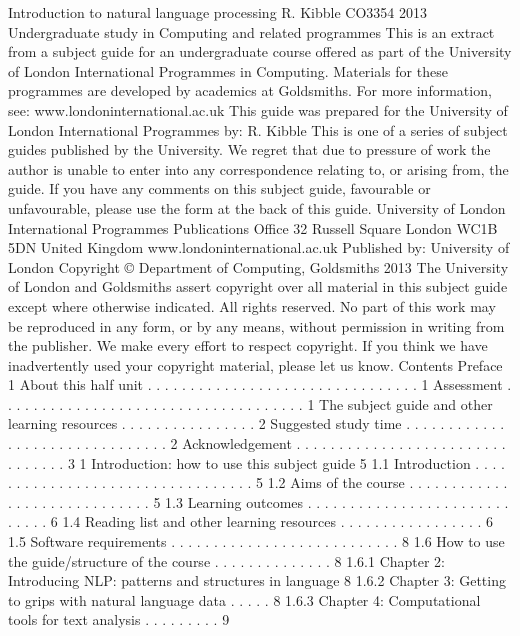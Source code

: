 Introduction to natural
language processing
R. Kibble
CO3354
2013
Undergraduate study in
Computing and related programmes
This is an extract from a subject guide for an undergraduate course offered as part of the
University of London International Programmes in Computing. Materials for these programmes
are developed by academics at Goldsmiths.
For more information, see: www.londoninternational.ac.uk
This guide was prepared for the University of London International Programmes by:
R. Kibble
This is one of a series of subject guides published by the University. We regret that due to pressure of work the author is
unable to enter into any correspondence relating to, or arising from, the guide. If you have any comments on this subject
guide, favourable or unfavourable, please use the form at the back of this guide.
University of London International Programmes
Publications Office
32 Russell Square
London WC1B 5DN
United Kingdom
www.londoninternational.ac.uk
Published by: University of London
Copyright © Department of Computing, Goldsmiths 2013
The University of London and Goldsmiths assert copyright over all material in this subject guide except where otherwise
indicated. All rights reserved. No part of this work may be reproduced in any form, or by any means, without permission in
writing from the publisher. We make every effort to respect copyright. If you think we have inadvertently used your copyright
material, please let us know.
Contents
Preface 1
About this half unit . . . . . . . . . . . . . . . . . . . . . . . . . . . . . . . . 1
Assessment . . . . . . . . . . . . . . . . . . . . . . . . . . . . . . . . . . . . 1
The subject guide and other learning resources . . . . . . . . . . . . . . . . 2
Suggested study time . . . . . . . . . . . . . . . . . . . . . . . . . . . . . . . 2
Acknowledgement . . . . . . . . . . . . . . . . . . . . . . . . . . . . . . . . 3
1 Introduction: how to use this subject guide 5
1.1 Introduction . . . . . . . . . . . . . . . . . . . . . . . . . . . . . . . . . 5
1.2 Aims of the course . . . . . . . . . . . . . . . . . . . . . . . . . . . . . 5
1.3 Learning outcomes . . . . . . . . . . . . . . . . . . . . . . . . . . . . . 6
1.4 Reading list and other learning resources . . . . . . . . . . . . . . . . . 6
1.5 Software requirements . . . . . . . . . . . . . . . . . . . . . . . . . . . 8
1.6 How to use the guide/structure of the course . . . . . . . . . . . . . . 8
1.6.1 Chapter 2: Introducing NLP: patterns and structures in language 8
1.6.2 Chapter 3: Getting to grips with natural language data . . . . . 8
1.6.3 Chapter 4: Computational tools for text analysis . . . . . . . . . 9
